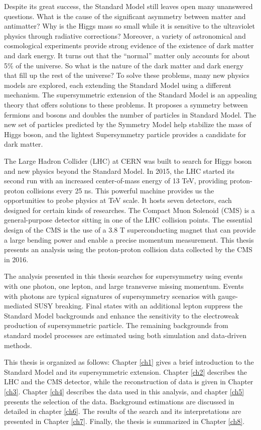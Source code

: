 \documentclass[12pt,oneside,letterpaper]{memoir}
\begin{document}
Despite its great success, the Standard Model still leaves open many unanswered questions. 
What is the cause of the significant asymmetry between matter and antimatter? 
Why is the Higgs mass so small while it is sensitive to the ultraviolet physics through radiative corrections?
Moreover, a variety of astronomical and cosmological experiments provide strong evidence of the existence of dark matter and dark energy. 
It turns out that the ``normal'' matter only accounts for about 5\% of the universe. 
So what is the nature of the dark matter and dark energy that fill up the rest of the universe? 
To solve these problems, many new physics models are explored, each extending the Standard Model using a different mechanism. 
The supersymmetric extension of the Standard Model is an appealing theory that offers solutions to these problems.
It proposes a symmetry between fermions and bosons and doubles the number of particles in Standard Model. 
The new set of particles predicted by the Symmetry Model help stabilize the mass of Higgs boson, and the lightest Supersymmetry particle provides a candidate for dark matter. 

The Large Hadron Collider (LHC) at CERN was built to search for Higgs boson and new physics beyond the Standard Model.
In 2015, the LHC started its second run with an increased center-of-mass energy of 13 TeV, providing proton-proton collisions every 25 ns. 
This powerful machine provides us the opportunities to probe physics at TeV scale. 
It hosts seven detectors, each designed for certain kinds of researches. 
The Compact Muon Solenoid (CMS) is a general-purpose detector sitting in one of the LHC collision points. 
The essential design of the CMS is the use of a 3.8 T superconducting magnet that can provide a large bending power and enable a precise momentum measurement. 
This thesis presents an analysis using the proton-proton collision data collected by the CMS in 2016. 

The analysis presented in this thesis searches for supersymmetry using events with one photon, one lepton, and large transverse missing momentum.  
Events with photons are typical signatures of supersymmetry scenarios with gauge-mediated SUSY breaking.
Final states with an additional lepton suppress the Standard Model backgrounds and enhance the sensitivity to the electroweak production of supersymmetric particle.
The remaining backgrounds from standard model processes are estimated using both simulation and data-driven methods. 

This thesis is organized as follows: Chapter \ref{ch1} gives a brief introduction to the Standard Model and its supersymmetric extension. Chapter \ref{ch2} describes the LHC and the CMS detector, while the reconstruction of data is given in Chapter \ref{ch3}. Chapter \ref{ch4} describes the data used in this analysis, and chapter  \ref{ch5} presents the selection of the data. Background estimations are discussed in detailed in chapter \ref{ch6}. The results of the search and its interpretations are presented in Chapter \ref{ch7}. Finally, the thesis is summarized in Chapter \ref{ch8}.

 









\newpage



\backmatter
\end{document}
